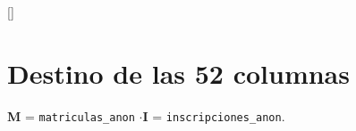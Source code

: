 \documentclass[11pt,a4paper,twoside,twocolumn]{article}
\newcommand{\cod}[1]{\nolinkurl{#1}}
\begin{document}
\clearpage
\appendix
\onecolumn
{}[{\color{ustaDorado}\titlerule[0.8pt]}]

\section{Destino de las 52 columnas}\label{app:columnas}

\textbf{M} = \cod{matriculas_anon} \quad$\cdot$\quad \textbf{I} = \cod{inscripciones_anon}.
\end{document}
